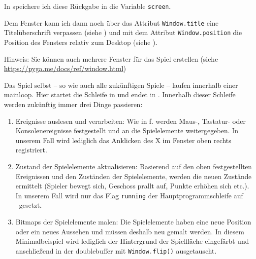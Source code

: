 In  speichere ich diese Rückgabe in die Variable \texttt{screen}.%

Dem Fenster kann ich dann noch über das Attribut  \texttt{Window.title} eine Titelüberschrift verpassen (siehe ) und mit dem Attribut \texttt{Window.position} die Position des Fensters relativ zum Desktop (siehe ).

Hinweis: Sie können auch mehrere Fenster für das Spiel erstellen (siehe \url{https://pyga.me/docs/ref/window.html})

Das Spiel selbst -- so wie auch alle zukünftigen Spiele -- laufen innerhalb einer \Gls{mainloop}. Hier startet die Schleife in  und endet in . Innerhalb dieser Schleife werden zukünftig immer drei Dinge passieren: 
\begin{enumerate}
	\item Ereignisse auslesen und verarbeiten: Wie in f. werden Maus-, Tastatur- oder Konsolenereignisse festgestellt und an die Spielelemente weitergegeben. In unserem Fall wird lediglich das Anklicken des X im Fenster oben rechts registriert.  
	\item Zustand der Spielelemente aktualisieren: Basierend auf den oben festgestellten Ereignissen und den Zuständen der Spielelemente, werden die neuen Zustände ermittelt (Spieler bewegt sich, Geschoss prallt auf, Punkte erhöhen sich etc.). In unserem Fall wird nur das Flag \texttt{running} der Hauptprogrammschleife auf \false\ gesetzt.
	\item Bitmaps der Spielelemente malen: Die Spielelemente haben eine neue Position oder ein neues Aussehen und müssen deshalb neu gemalt werden. In diesem Minimalbeispiel wird lediglich  der Hintergrund der Spielfläche eingefärbt und anschließend in  der \Gls{doublebuffer} mit \texttt{Window.flip()} ausgetauscht.
\end{enumerate}

